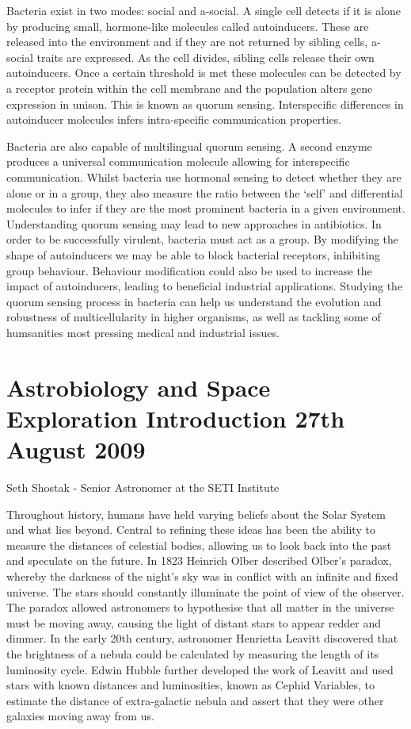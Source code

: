\documentclass{article}
\begin{document}
\noindent Bacteria exist in two modes: social and a-social. A single cell detects if it is alone by producing small, hormone-like molecules called autoinducers. These are released into the environment and if they are not returned by sibling cells, a-social traits are expressed. As the cell divides, sibling cells release their own autoinducers.  Once a certain threshold is met these molecules can be detected by a receptor protein within the cell membrane and the population alters gene expression in unison. This is known as quorum sensing. Interspecific differences in autoinducer molecules infers intra-specific communication properties. \bigskip

\noindent Bacteria are also capable of multilingual quorum sensing. A second enzyme produces a universal communication molecule allowing for interspecific communication. Whilst bacteria use hormonal sensing to detect whether they are alone or in a group, they also measure the ratio between the ‘self’ and differential molecules to infer if they are the most prominent bacteria in a given environment. Understanding quorum sensing may lead to new approaches in antibiotics. In order to be successfully virulent, bacteria must act as a group. By modifying the shape of autoinducers we may be able to block bacterial receptors, inhibiting group behaviour. Behaviour modification could also be used to increase the impact of autoinducers, leading to beneficial industrial applications. Studying the quorum sensing process in bacteria can help us understand the evolution and robustness of multicellularity in higher organisms, as well as tackling some of humsanities most pressing medical and industrial issues. 

\section{Astrobiology and Space Exploration Introduction 27th August 2009}

Seth Shostak - Senior Astronomer at the SETI Institute \bigskip

\noindent Throughout history, humans have held varying beliefs about the Solar System and what lies beyond. Central to refining these ideas has been the ability to measure the distances of celestial bodies, allowing us to look back into the past and speculate on the future. In 1823 Heinrich Olber described Olber’s paradox, whereby the darkness of the night’s sky was in conflict with an infinite and fixed universe. The stars should constantly illuminate the point of view of the observer. The paradox allowed astronomers to hypothesise that all matter in the universe must be moving away, causing the light of distant stars to appear redder and dimmer. In the early 20th century, astronomer Henrietta Leavitt discovered that the brightness of a nebula could be calculated by measuring the length of its luminosity cycle. Edwin Hubble further developed the work of Leavitt and used stars with known distances and luminosities, known as Cephid Variables, to estimate the distance of extra-galactic nebula and assert that they were other galaxies moving away from us. \bigskip
\end{document}
